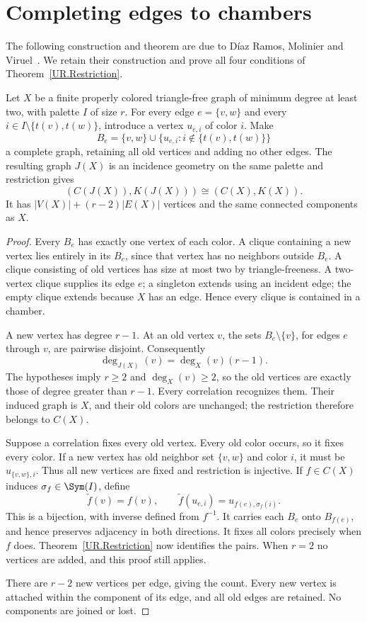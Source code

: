 \section{Completing edges to chambers}
\label{sec:chambers}
The following construction and theorem are due to D\'iaz Ramos, Molinier and
Viruel~\cite[Theorem 4.1]{DMV}. We retain their construction and prove all four
conditions of Theorem~\ref{UR.Restriction}.

\begin{theorem}\label{UR.Chambers}
Let $X$ be a finite properly colored triangle-free graph of minimum degree at
least two, with palette $I$ of size $r$. For every edge $e=\{v,w\}$ and every
$i\in I\setminus\{t(v),t(w)\}$, introduce a vertex $u_{e,i}$ of color $i$.
Make
\[
 B_e=\{v,w\}\cup\{u_{e,i}:i\notin\{t(v),t(w)\}\}
\]
a complete graph, retaining all old vertices and adding no other edges.
The resulting graph $J(X)$ is an incidence geometry on the same palette and
restriction gives
\[
 (C(J(X)),K(J(X)))\cong(C(X),K(X)).
\]
It has $|V(X)|+(r-2)|E(X)|$ vertices and the same connected components as $X$.
\end{theorem}
\begin{proof}
Every $B_e$ has exactly one vertex of each color. A clique containing a new
vertex lies entirely in its $B_e$, since that vertex has no neighbors outside
$B_e$. A clique consisting of old vertices has size at most two by
triangle-freeness. A two-vertex clique supplies its edge $e$; a singleton
extends using an incident edge; the empty clique extends because $X$ has an
edge. Hence every clique is contained in a chamber.

A new vertex has degree $r-1$. At an old vertex $v$, the sets
$B_e\setminus\{v\}$, for edges $e$ through $v$, are pairwise disjoint.
Consequently
\begin{equation}\label{eq:degrees}
 \deg_{J(X)}(v)=\deg_X(v)(r-1).
\end{equation}
The hypotheses imply $r\geq2$ and $\deg_X(v)\geq2$, so the old vertices
are exactly those of degree greater than $r-1$. Every correlation recognizes
them. Their induced graph is $X$, and their old colors are unchanged; the
restriction therefore belongs to $C(X)$.

Suppose a correlation fixes every old vertex. Every old color occurs, so it
fixes every color. If a new vertex has old neighbor set $\{v,w\}$ and color
$i$, it must be $u_{\{v,w\},i}$. Thus all new vertices are fixed and
restriction is injective. If $f\in C(X)$ induces $\sigma_f\in\Sym(I)$,
define
\[
 \widetilde f(v)=f(v),\qquad
 \widetilde f(u_{e,i})=u_{f(e),\sigma_f(i)}.
\]
This is a bijection, with inverse defined from $f^{-1}$. It carries each
$B_e$ onto $B_{f(e)}$, and hence preserves adjacency in both directions.
It fixes all colors precisely when $f$ does. Theorem~\ref{UR.Restriction}
now identifies the pairs. When $r=2$ no vertices are added, and this proof
still applies.

There are $r-2$ new vertices per edge, giving the count. Every new vertex is
attached within the component of its edge, and all old edges are retained.
No components are joined or lost.
\end{proof}

